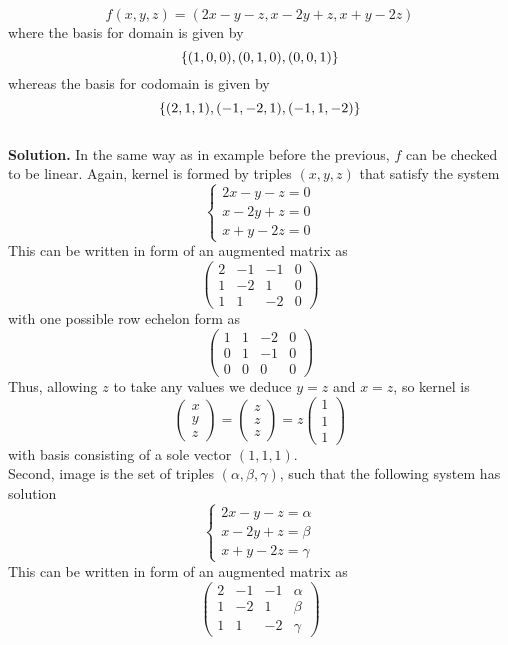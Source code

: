 \documentclass[12pt]{article} %
\begin{document}
\begin{enumerate}
	\[f(x,y,z)=(2x-y-z,x-2y+z,x+y-2z)\]
	where the basis for domain is given by
	\[\left\{(1,0,0),(0,1,0),(0,0,1)\right\}\]
	whereas the basis for codomain is given by
	\[\left\{(2,1,1),(-1,-2,1),(-1,1,-2)\right\}\]
	\\\textbf{Solution.} 
	In the same way as in example before the previous, $f$ can be checked to be linear. Again, kernel is formed by triples
	$(x,y,z)$ that satisfy the system
	\[\begin{cases}2x-y-z=0\\x-2y+z=0\\x+y-2z=0\end{cases}\]
	This can be written in form of an augmented matrix as
	\[\left(\begin{array}{rrr|r}2&-1&-1&0\\1&-2&1&0\\1&1&-2&0\end{array}\right)\]
	with one possible row echelon form as
	\[\left(\begin{array}{rrr|r}1&1&-2&0\\0&1&-1&0\\0&0&0&0\end{array}\right)\]
	Thus, allowing $z$ to take any values we deduce $y=z$ and $x=z$, so kernel is
	\[\begin{pmatrix}x\\y\\z\end{pmatrix}=\begin{pmatrix}z\\z\\z\end{pmatrix}=z\begin{pmatrix}1\\1\\1\end{pmatrix}\]
	with basis consisting of a sole vector $(1,1,1)$. \\
	Second, image is the set of triples $(\alpha,\beta,\gamma)$, such that the following system has solution
	\[\begin{cases}2x-y-z=\alpha\\x-2y+z=\beta\\x+y-2z=\gamma\end{cases}\]
	This can be written in form of an augmented matrix as
	\[\left(\begin{array}{rrr|r}2&-1&-1&\alpha\\1&-2&1&\beta\\1&1&-2&\gamma\end{array}\right)\]

\end{enumerate}
\end{document}
